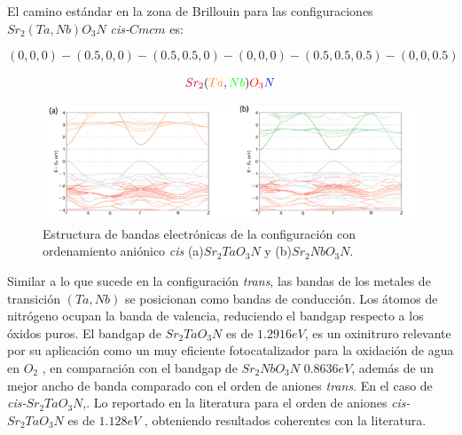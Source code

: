 El camino estándar en la zona de Brillouin para las configuraciones $Sr_{2}(Ta,Nb)O_{3}N$ \emph{cis-}$Cmcm$ es:

$$(0,0,0)-(0.5,0,0)-(0.5,0.5,0)-(0,0,0)-(0.5,0.5,0.5)-(0,0,0.5)$$

$$\textcolor{purple}{Sr_{2}}(\textcolor{orange}{Ta},\textcolor{green}{Nb})\textcolor{O}{O_{3}}\textcolor{blue}{N}$$

\begin{figure}[H]
    \centering
    \includegraphics[width=1\textwidth]{Figs/cis_all.png}
    \caption{Estructura de bandas electrónicas de la configuración con ordenamiento aniónico \emph{cis} (a)$Sr_{2}TaO_{3}N$ y  (b)$Sr_{2}NbO_{3}N$.}
    \label{Fig. bandas_cis_estandar}
\end{figure}

Similar a lo que sucede en la configuración \emph{trans}, las bandas de los metales de transición $(Ta, Nb)$ se posicionan como bandas de conducción. Los átomos de nitrógeno ocupan la banda de valencia, reduciendo el bandgap respecto a los óxidos puros. El bandgap de $Sr_{2}TaO_{3}N$ es de $1.2916  eV$, es un oxinitruro relevante por su aplicación como un muy eficiente fotocatalizador para la oxidación de agua en $O_{2}$ \cite{Tobias2004}, en comparación con el bandgap de $Sr_{2}NbO_{3}N$ $0.8636  eV$, además de un mejor ancho de banda comparado con el orden de aniones \emph{trans}. En el caso de \emph{cis-}$Sr_{2}TaO_{3}N$,. Lo reportado en la literatura para el orden de aniones \emph{cis-}$Sr_{2}TaO_{3}N$ es de $1.128 eV$ \cite{Bouri2018}, obteniendo resultados coherentes con la literatura.%

